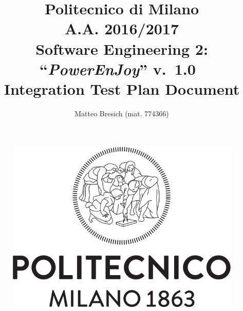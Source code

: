 \documentclass{article}
\newcommand{\version}{\mbox{\normalfont v. 1.0 }}
\begin{document}
	\title{Politecnico di Milano\\A.A. 2016/2017\\Software Engineering 2: ``{\em PowerEnJoy}'' \version \\ \bigskip \textbf{I}ntegration \textbf{T}est \textbf{P}lan \textbf{D}ocument }
	\author{Matteo Bresich (mat. 774366)}
	
	
	
	\begin{figure}[t]
		\centering
		\includegraphics[width=\linewidth]{"img/logo-polimi"}
		\label{fig:polimi-logo}
	\end{figure}

	\maketitle
	
	\thispagestyle{empty}
	\clearpage\mbox{}\thispagestyle{empty}\clearpage
	
	\renewcommand*\thesection{\arabic{section}}
	\renewcommand*\thesubsection{\arabic{section}.\arabic{subsection}}
	\renewcommand*\thesubsubsection{%
		\arabic{section}.\arabic{subsection}.\arabic{subsubsection}%
	}
	\setcounter{secnumdepth}{4}
	\setcounter{tocdepth}{4}
	
	\renewcommand{\contentsname}{Table of Content}
	\tableofcontents
	
\end{document}
